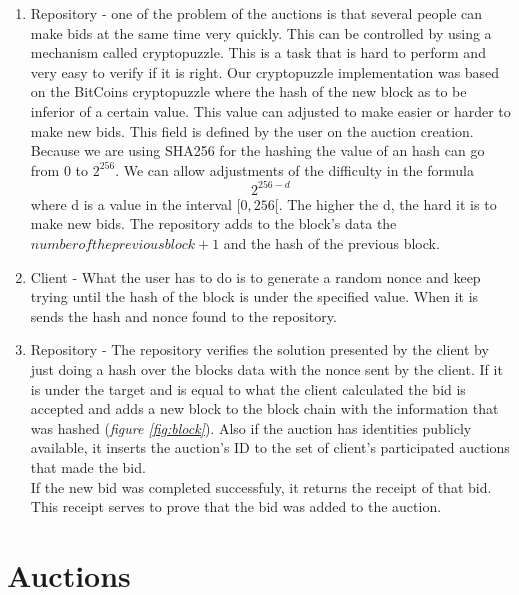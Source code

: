 \documentclass[12pt]{article}
\begin{document}
\begin{enumerate}
    \item Repository - one of the problem of the auctions is that several people can make bids at the same
      \label{itm:cryptopuzzle}
      time very quickly. This can be controlled by using a mechanism called cryptopuzzle. This is a task that 
      is hard to perform and very easy to verify if it is right. Our cryptopuzzle implementation was 
      based on the BitCoins cryptopuzzle where the hash of the new block as to be inferior of a certain 
      value. This value can adjusted to make easier or harder to make new bids. This field is defined 
      by the user on the auction creation. Because we are using SHA256 for the hashing the value of 
      an hash can go from 0 to \(2^{256}\). We can allow adjustments of the difficulty in the formula
      \[2^{256-d}\]
      where d is a value in the interval \([0,256[\). The higher the d, the hard it is to make new bids.
      The repository adds to the block's data the \(number of the previous block + 1\) and the hash of the 
      previous block.

    \item Client - What the user has to do is to generate a random nonce and keep trying until the hash 
      of the block is under the specified value. When it is sends the hash and nonce found to the repository.

    \item Repository - The repository verifies the solution presented by the client by just doing a hash
      over the blocks data with the nonce sent by the client. If it is under the target and is equal to
      what the client calculated the bid is accepted and adds a new block to the block chain with the 
      information that was hashed (\textit{figure \ref{fig:block}}). Also if the auction has identities publicly 
      available, it inserts the auction's ID to the set of client's participated auctions that made the bid.\\
      If the new bid was completed successfuly, it returns the receipt of that bid. This receipt serves to prove that
      the bid was added to the auction. 

\end{enumerate}

\section{Auctions}
\end{document}
